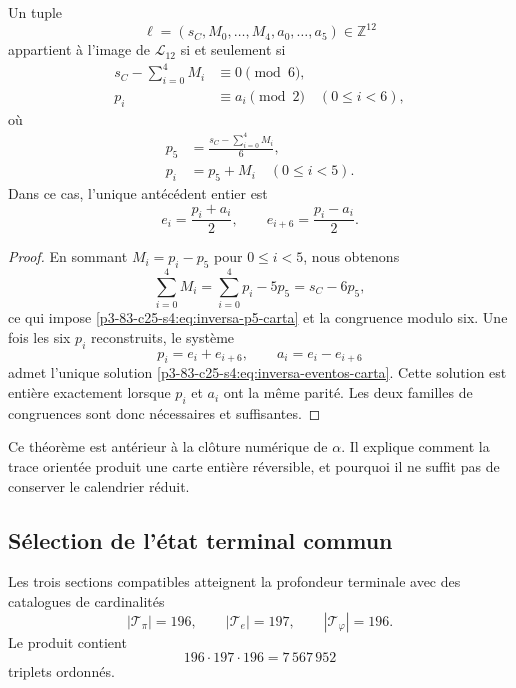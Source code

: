 \begin{theorem}
\label{p3-83-c25-s4:thm:inversion-carta-integral-156}
Un tuple
\[
 \ell=(s_C,M_0,\ldots,M_4,a_0,\ldots,a_5)\in\mathbb Z^{12}
\]
appartient à l’image de \(\mathcal L_{12}\) si et seulement si
\begin{align}
 s_C-\sum_{i=0}^{4}M_i&\equiv0\pmod6,
 \label{p3-83-c25-s4:eq:congruencia-seis-carta}\\
 p_i&\equiv a_i\pmod2
 \quad(0\leq i<6),
 \label{p3-83-c25-s4:eq:congruencia-paridad-carta}
\end{align}
où
\begin{align}
 p_5&=\frac{s_C-\sum_{i=0}^{4}M_i}{6},
 \label{p3-83-c25-s4:eq:inversa-p5-carta}\\
 p_i&=p_5+M_i\quad(0\leq i<5).
 \label{p3-83-c25-s4:eq:inversa-pi-carta}
\end{align}
Dans ce cas, l’unique antécédent entier est
\begin{equation}
 e_i=\frac{p_i+a_i}{2},
 \qquad
 e_{i+6}=\frac{p_i-a_i}{2}.
 \label{p3-83-c25-s4:eq:inversa-eventos-carta}
\end{equation}
\end{theorem}

\begin{proof}
En sommant \(M_i=p_i-p_5\) pour \(0\leq i<5\), nous obtenons
\[
 \sum_{i=0}^{4}M_i
 =\sum_{i=0}^{4}p_i-5p_5
 =s_C-6p_5,
\]
ce qui impose \eqref{p3-83-c25-s4:eq:inversa-p5-carta} et la congruence modulo six.
Une fois les six \(p_i\) reconstruits, le système
\[
 p_i=e_i+e_{i+6},
 \qquad a_i=e_i-e_{i+6}
\]
admet l’unique solution \eqref{p3-83-c25-s4:eq:inversa-eventos-carta}. Cette solution est
entière exactement lorsque \(p_i\) et \(a_i\) ont la même parité.
Les deux familles de congruences sont donc nécessaires et suffisantes.
\end{proof}

Ce théorème est antérieur à la clôture numérique de \(\alpha\). Il explique comment la
trace orientée produit une carte entière réversible, et pourquoi il ne suffit pas
de conserver le calendrier réduit.

\subsection{Sélection de l’état terminal commun}

Les trois sections compatibles atteignent la profondeur terminale avec des catalogues
de cardinalités
\[
 |\mathcal T_\pi|=196,
 \qquad
 |\mathcal T_e|=197,
 \qquad
 |\mathcal T_\varphi|=196.
\]
Le produit contient
\begin{equation}
 196\cdot197\cdot196=7\,567\,952
 \label{p3-83-c25-s4:eq:cardinal-producto-terminal}
\end{equation}
triplets ordonnés.

